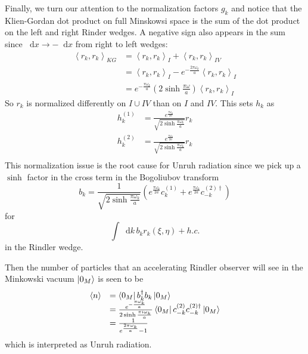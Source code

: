 \documentclass[12pt,a4paper]{article}
\newcommand*\diff{\mathop{}\!\mathrm{d}}
\begin{document}
Finally, we turn our attention to the normalization factors $g_k$ and notice that the Klien-Gordan dot product on full Minskowsi space is the sum of the dot product on the left and right Rinder wedges.  A negative sign also appears in the sum since $\diff x \rightarrow -\diff x$ from right to left wedges:
\begin{equation}
 \begin{array}{ll}
  \left< r_k, r_k \right>_{KG} &= \left< r_k, r_k \right>_{I} + \left< r_k, r_k \right>_{IV} \\
  &= \left< r_k, r_k \right>_{I} - e^{- \frac{2\pi \omega_k}{a}} \left< r_k, r_k \right>_{I} \\
  &= e^{-\frac{\pi \omega_k}{a}} (2 \sinh \frac{\pi \omega}{a}) \left< r_k, r_k \right>_{I}
  \end{array}
\end{equation}
So $r_k$ is normalized differently on $I \cup IV$ than on $I$ and $IV$.  This sets $h_k$ as
\begin{equation}
  \begin{array}{ll}
    h_k^{(1)} &= \frac{e^\frac{\pi \omega_k}{2a}}{\sqrt{2 \sinh \frac{\pi \omega_k}{a}}} r_k \\
    h_k^{(2)} &= \frac{e^\frac{\pi \omega_k}{2a}}{\sqrt{2 \sinh \frac{\pi \omega_k}{a}}} r_k \\
  \end{array}
\end{equation}  
This normalization issue is the root cause for Unruh radiation since we pick up a $\sinh$ factor in the cross term in the Bogoliubov transform
\begin{equation}
  b_k = \frac{1}{\sqrt{2 \sinh \frac{\pi \omega_k}{a}}} \left( e^\frac{\pi \omega_k}{2a} c_k^{(1)} + e^\frac{\pi \omega_k}{2a} c_{-k}^{(2)\dagger} \right)
\label{bogo}
\end{equation}
for
\begin{equation}
  \int \diff k \, b_k r_k(\xi,\eta) + h.c.
\end{equation}
in the Rindler wedge.

Then the number of particles that an accelerating Rindler observer will see in the Minkowski vacuum $\ket{0_M}$ is seen to be 
\begin{equation}
  \label{radeq}
  \begin{array}{ll}
    \braket{n} &= \bra{0_M} b_k^\dagger b_k \ket{0_M} \\
               &= \frac{e^{-\frac{\pi \omega_k}{a}}}{2 \sinh \frac{\pi i \omega_k}{a}}\bra{0_M}  c_{-k}^{(2)} c_{-k}^{(2)\dagger} \ket{0_M} \\
               &= \frac{1}{e^{\frac{2 \pi \omega_k}{a}}-1} \\
  \end{array}
\end{equation}
which is interpreted as Unruh radiation.
\end{document}
